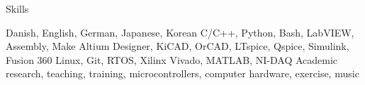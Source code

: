 
\begin{rubric}{\faStar[solid] Skills}

\entry*[Languages][\faLanguage]
	Danish, English, German, Japanese, Korean
\entry*[Coding][\faCode]
	C/C++, Python, Bash, LabVIEW, Assembly, Make
	Altium Designer, KiCAD, OrCAD, LTspice, Qspice, Simulink, Fusion 360
\entry*[Technologies][\faTerminal]
	Linux, Git, RTOS, Xilinx Vivado, MATLAB, NI-DAQ
\entry*[Misc.][\faUser]
	Academic research, teaching, training, microcontrollers, computer hardware, exercise, music
\end{rubric}
